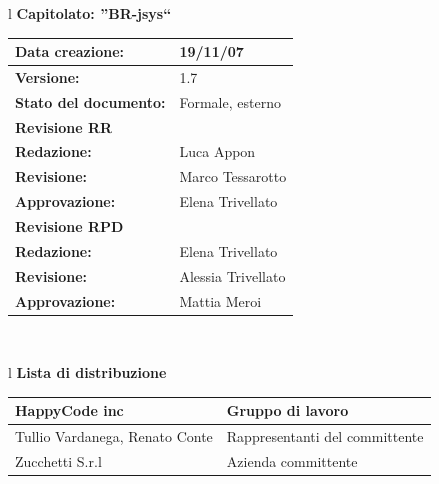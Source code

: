 \documentclass[11pt,titlepage,a4paper]{report}
\begin{document}
\begin{center}
\thispagestyle{plain}
\begin{table}[htbp]
\large{
\begin{tabular}{l}
\Large{\textbf{\textsf{Capitolato: ''BR-jsys``}}} \\
\begin{tabular}{||p{6cm}||p{6cm}||} \hline
\textbf{Data creazione:} & 19/11/07 \\ \hline
\textbf{Versione:} & 1.7 \\ \hline
\textbf{Stato del documento:} & Formale, esterno \\ \hline
\textbf{Revisione RR}     \\ \hline
\textbf{Redazione:} & Luca Appon \\ \hline
\textbf{Revisione:} & Marco Tessarotto   \\ \hline
\textbf{Approvazione:}  & Elena Trivellato \\ \hline
\textbf{Revisione RPD}     \\ \hline
\textbf{Redazione:} & Elena Trivellato\\ \hline
\textbf{Revisione:} & Alessia Trivellato   \\ \hline
\textbf{Approvazione:}  & Mattia Meroi \\ \hline

\end{tabular} \\
\end{tabular}
}
\end{table}

\begin{table}[hbtp]
\large{
\begin{tabular}{l}
\Large{\textbf{\textsf{Lista di distribuzione}}} \\
\begin{tabular}{||p{6cm}||p{6cm}||} \hline
{HappyCode inc}& Gruppo di lavoro\\ \hline
{Tullio Vardanega, Renato Conte}& Rappresentanti del committente \\ \hline
{Zucchetti S.r.l}& Azienda committente\\ \hline
\end{tabular} \\
\end{tabular}
}
\end{table}


\end{center}
\end{document}
